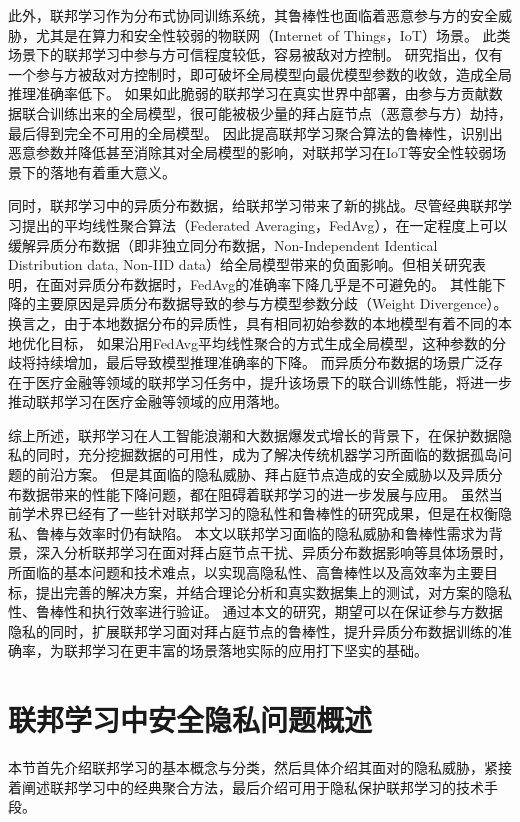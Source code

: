 此外，联邦学习作为分布式协同训练系统，其鲁棒性也面临着恶意参与方的安全威胁，尤其是在算力和安全性较弱的物联网（Internet of Things，IoT）场景。
此类场景下的联邦学习中参与方可信程度较低，容易被敌对方控制。
研究\cite{blanchard2017machine}指出，仅有一个参与方被敌对方控制时，即可破坏全局模型向最优模型参数的收敛，造成全局推理准确率低下。
如果如此脆弱的联邦学习在真实世界中部署，由参与方贡献数据联合训练出来的全局模型，很可能被极少量的拜占庭节点（恶意参与方）劫持，最后得到完全不可用的全局模型。
因此提高联邦学习聚合算法的鲁棒性，识别出恶意参数并降低甚至消除其对全局模型的影响，对联邦学习在IoT等安全性较弱场景下的落地有着重大意义。

同时，联邦学习中的异质分布数据，给联邦学习带来了新的挑战。尽管经典联邦学习提出的平均线性聚合算法（Federated Averaging，FedAvg）\cite{mcmahan2017communication}，在一定程度上可以缓解异质分布数据（即非独立同分布数据，Non-Independent Identical Distribution data, Non-IID data）给全局模型带来的负面影响。但相关研究\cite{zhao2018federated}表明，在面对异质分布数据时，FedAvg的准确率下降几乎是不可避免的。
其性能下降的主要原因是异质分布数据导致的参与方模型参数分歧（Weight Divergence）。
换言之，由于本地数据分布的异质性，具有相同初始参数的本地模型有着不同的本地优化目标，
如果沿用FedAvg平均线性聚合的方式生成全局模型，这种参数的分歧将持续增加，最后导致模型推理准确率的下降。
而异质分布数据的场景广泛存在于医疗金融等领域的联邦学习任务中，提升该场景下的联合训练性能，将进一步推动联邦学习在医疗金融等领域的应用落地。

综上所述，联邦学习在人工智能浪潮和大数据爆发式增长的背景下，在保护数据隐私的同时，充分挖掘数据的可用性，成为了解决传统机器学习所面临的数据孤岛问题的前沿方案。
但是其面临的隐私威胁、拜占庭节点造成的安全威胁以及异质分布数据带来的性能下降问题，都在阻碍着联邦学习的进一步发展与应用。
虽然当前学术界已经有了一些针对联邦学习的隐私性和鲁棒性的研究成果，但是在权衡隐私、鲁棒与效率时仍有缺陷。
本文以联邦学习面临的隐私威胁和鲁棒性需求为背景，深入分析联邦学习在面对拜占庭节点干扰、异质分布数据影响等具体场景时，所面临的基本问题和技术难点，以实现高隐私性、高鲁棒性以及高效率为主要目标，提出完善的解决方案，并结合理论分析和真实数据集上的测试，对方案的隐私性、鲁棒性和执行效率进行验证。
通过本文的研究，期望可以在保证参与方数据隐私的同时，扩展联邦学习面对拜占庭节点的鲁棒性，提升异质分布数据训练的准确率，为联邦学习在更丰富的场景落地实际的应用打下坚实的基础。

\section{联邦学习中安全隐私问题概述}
本节首先介绍联邦学习的基本概念与分类，然后具体介绍其面对的隐私威胁，紧接着阐述联邦学习中的经典聚合方法，最后介绍可用于隐私保护联邦学习的技术手段。
\newpage
